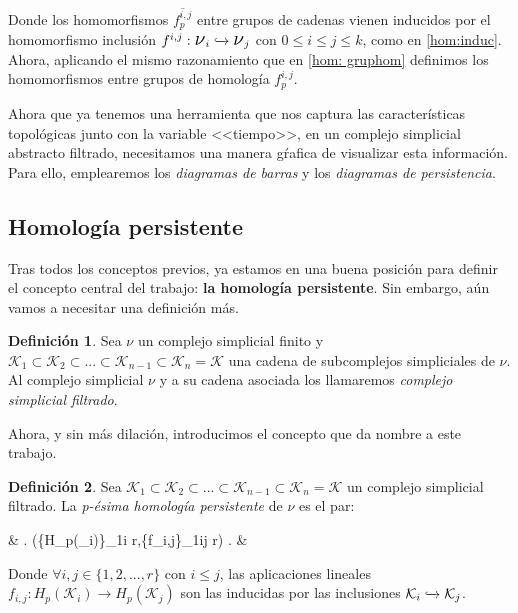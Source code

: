 \documentclass[12pt, a4paper]{article}
\numberwithin{equation}{section}
\theoremstyle{definition}
\newtheorem{defi}{Definición}
\theoremstyle{remark}
\theoremstyle{plain}
\begin{document}
	Donde los homomorfismos $\overline{f_{p}^{i,j}}$ entre grupos de 
	cadenas vienen inducidos por el homomorfismo inclusión $f^{i,j}: 
	\text{{\Large $\nu$}$_{i}$} \xhookrightarrow{} 
	\text{{\Large $\nu$}$_{j}$}$ con $0\leq i \leq j \leq k$, como en 
	\ref{hom:induc}. Ahora, aplicando el mismo razonamiento que en 
	\ref{hom: gruphom} definimos los homomorfismos entre grupos de 
	homología $f^{i,j}_{p}$.

	Ahora que ya tenemos una herramienta que nos captura las 
	características topológicas junto con la variable <<tiempo>>, en un 
	complejo simplicial abstracto filtrado, necesitamos una manera gŕafica 
	de visualizar esta información. Para ello, emplearemos los  
	\emph{diagramas de barras} y los \emph{diagramas de persistencia}.
	
	\subsection{Homología persistente}	
		
		Tras todos los conceptos previos, ya estamos en una buena posición para definir el concepto central del trabajo: \textbf{la homología persistente}. Sin embargo, aún
		vamos a necesitar una definición más.

		\begin{defi}
		
			Sea {\Large $\nu$} un complejo simplicial finito y $\mathcal{K}_{1}\subset\mathcal{K}_{2}\subset...\subset\mathcal{K}_{n-1}\subset\mathcal{K}_{n}=\mathcal{K}$
			una cadena de subcomplejos simpliciales de {\Large $\nu$}. Al complejo simplicial {\Large $\nu$} y a su cadena asociada los llamaremos \textit{complejo simplicial filtrado}.

		\end{defi}

		Ahora, y sin más dilación, introducimos el concepto que da nombre a este trabajo.

		\begin{defi}
		
			Sea $\mathcal{K}_{1}\subset\mathcal{K}_{2}\subset...\subset\mathcal{K}_{n-1}\subset\mathcal{K}_{n}=\mathcal{K}$ un complejo simplicial filtrado. La 
			\textit{p-ésima homología persistente} de {\Large $\nu$} es el par:
			\begin{flalign*}
				& \left.	
				(\{H_{p}(_{i})\}_{1\leq i \leq r},\{f_{i,j}\}_{1\leq i\leq j \leq r})
				\right. &
			\end{flalign*}
			Donde $\forall i,j \in \{1,2,...,r\}$ con $i \leq j$, las aplicaciones lineales 
			$f_{i,j}:H_{p}(\mathcal{K}_{i})\rightarrow H_{p}(\mathcal{K}_{j})$ son las inducidas por las inclusiones $\mathcal{K}_{i}\xhookrightarrow{} \mathcal{K}_{j}$.
	

		\end{defi}
		
\end{document}
